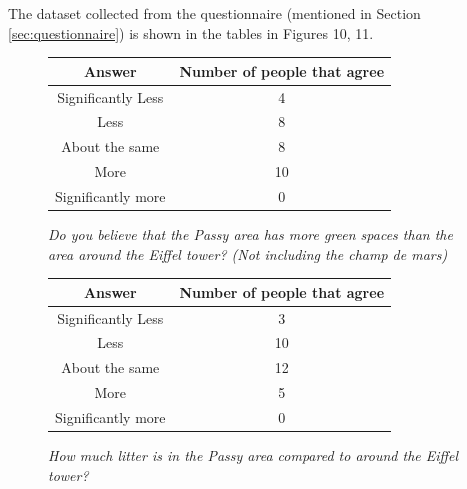 \documentclass[11pt,letterpaper]{article}
\begin{document}
The dataset collected from the questionnaire (mentioned in Section \ref{sec:questionnaire}) is shown in the tables in Figures 10, 11.

\begin{figure}[H]
    \begin{center}
        \begin{tabular}{||c c||}
            \hline
            Answer             & Number of people that agree \\ [0.5ex]
            \hline\hline
            Significantly Less & 4                           \\
            \hline
            Less               & 8                           \\
            \hline
            About the same     & 8                           \\
            \hline
            More               & 10                          \\
            \hline
            Significantly more & 0                           \\ [1ex]
            \hline
        \end{tabular}
    \end{center}
    \caption{\textit{Do you believe that the Passy area has more green spaces than the area around the Eiffel tower? (Not including the champ de mars)}}
\end{figure}

\begin{figure}[H]
    \begin{center}
        \begin{tabular}{||c c||}
            \hline
            Answer             & Number of people that agree \\ [0.5ex]
            \hline\hline
            Significantly Less & 3                           \\
            \hline
            Less               & 10                          \\
            \hline
            About the same     & 12                          \\
            \hline
            More               & 5                           \\
            \hline
            Significantly more & 0                           \\ [1ex]
            \hline
        \end{tabular}
    \end{center}
    \caption{\textit{How much litter is in the Passy area compared to around the Eiffel tower?}}
\end{figure}
\end{document}
